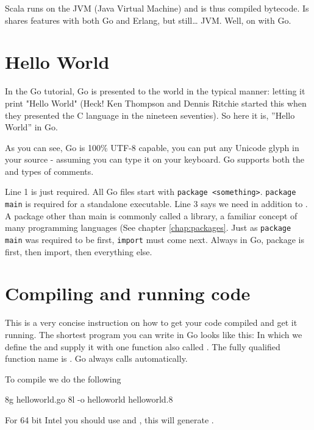 Scala runs on the JVM (Java Virtual Machine) and is thus compiled 
bytecode. Is shares features with both Go and Erlang, but still\ldots
JVM.  Well, on with Go.

\section{Hello World}
\label{sec:hello world}
In the Go tutorial, Go is presented to the world in the typical
manner: letting it print "Hello World" (Heck! Ken Thompson and
Dennis Ritchie started this when they presented the C language in 
the nineteen seventies).
So here it is, ''Hello World'' in Go.


As you can see, Go is 100\% UTF-8 capable, you can put any Unicode
glyph in your source - assuming you can type it on your keyboard.
Go supports both the \texttt{\rem{/* */}} and \texttt{\rem{//}} types of comments. 

Line 1 is just required.  All Go files start with \lstinline{package <something>}.
\lstinline{package main} is required for a standalone executable.  Line 3 says
we need  in addition to .  A package other than
main is commonly called a library, a familiar concept of many programming
languages (See chapter \ref{chap:packages}. 
Just as \lstinline{package main} was required to be first, 
\lstinline{import} must come next. Always in Go, package is first, then import, 
then everything else.

\section{Compiling and running code}
This is a very concise instruction on how to get your code
compiled and get it running.
The shortest program you can write in Go looks like
this:
In which we define the   and supply it with one
function also called . The fully qualified function
name is . Go always calls  automatically.

To compile we do the following

\begin{display}
\pr 8g helloworld.go \qquad\qquad\qquad{}
\pr 8l -o helloworld helloworld.8 \qquad{}
\end{display}
For 64 bit Intel you should use  and , this will
generate .

